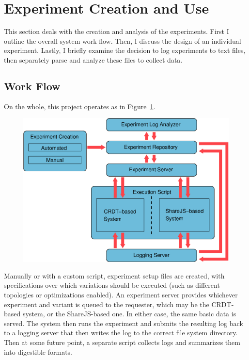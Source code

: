 \documentclass[12pt,a4paper,twoside,openright]{report}
\begin{document}
\section{Experiment Creation and Use} \label{sec:experimentcreation}

	This section deals with the creation and analysis of the experiments. First I outline the overall system work flow. Then, I discuss the design of an individual experiment. Lastly, I briefly examine the decision to log experiments to text files, then separately parse and analyze these files to collect data.

	\subsection{Work Flow}
	On the whole, this project operates as in Figure~\ref{fig:workflow}. 
	
	\begin{figure}[htb]
	\centering
	\includegraphics[width=1\linewidth]{figs/workflow.eps}
	\caption[Workflow]{}
	\label{fig:workflow}
	\end{figure}

	
	
	Manually or with a custom script, experiment setup files are created, with specifications over which variations should be executed (such as different topologies or optimizations enabled). An experiment server provides whichever experiment and variant is queued to the requester, which may be the CRDT-based system, or the ShareJS-based one. In either case, the same basic data is served. The system then runs the experiment and submits the resulting log back to a logging server that then writes the log to the correct file system directory. Then at some future point, a separate script collects logs and summarizes them into digestible formats.
\end{document}
